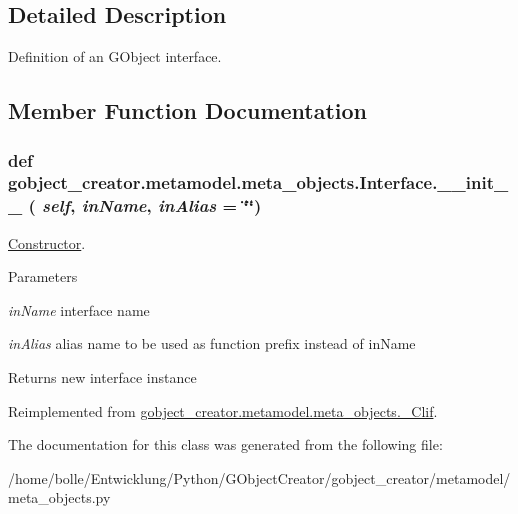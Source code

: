 \subsection{Detailed Description}
Definition of an GObject interface. 

\subsection{Member Function Documentation}
\hypertarget{classgobject__creator_1_1metamodel_1_1meta__objects_1_1Interface_a3211fc395bb2b5436b9a89d4dcb097d8}{
\subsubsection[{\_\-\_\-init\_\-\_\-}]{\setlength{\rightskip}{0pt plus 5cm}def gobject\_\-creator.metamodel.meta\_\-objects.Interface.\_\-\_\-init\_\-\_\- ( {\em self}, \/   {\em inName}, \/   {\em inAlias} = {\ttfamily \char`\"{}\char`\"{}})}}
\label{classgobject__creator_1_1metamodel_1_1meta__objects_1_1Interface_a3211fc395bb2b5436b9a89d4dcb097d8}


\hyperlink{classgobject__creator_1_1metamodel_1_1meta__objects_1_1Constructor}{Constructor}. 


\begin{DoxyParams}{Parameters}
\item[{\em inName}]interface name \item[{\em inAlias}]alias name to be used as function prefix instead of inName \end{DoxyParams}
\begin{DoxyReturn}{Returns}
new interface instance 
\end{DoxyReturn}


Reimplemented from \hyperlink{classgobject__creator_1_1metamodel_1_1meta__objects_1_1__Clif}{gobject\_\-creator.metamodel.meta\_\-objects.\_\-Clif}.



The documentation for this class was generated from the following file:\begin{DoxyCompactItemize}
\item 
/home/bolle/Entwicklung/Python/GObjectCreator/gobject\_\-creator/metamodel/meta\_\-objects.py\end{DoxyCompactItemize}
